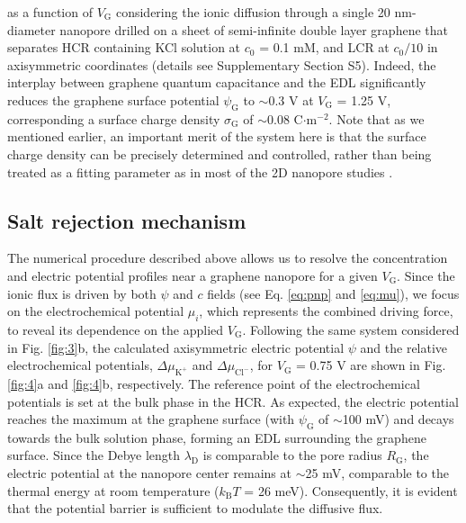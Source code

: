 \documentclass[journal=langd5,email=true, hyperref=true, keywords=false]{achemso}
\newcommand{\Fig}{Fig.}
\begin{document}
as a function of $V_{\mathrm{G}}$ considering the ionic diffusion
through a single 20 nm-diameter nanopore drilled on a sheet of
semi-infinite double layer graphene that separates HCR containing KCl
solution at $c_{0}$ = 0.1 mM, and LCR at $c_{0}/10$ in axisymmetric
coordinates (details see Supplementary Section S5). Indeed, the
interplay between graphene quantum capacitance and the EDL
significantly reduces the graphene surface potential
$\psi_{\mathrm{G}}$ to $\sim$0.3 V at $V_{\mathrm{G}}$ = 1.25 V,
corresponding a surface charge density $\sigma_{\mathrm{G}}$ of
$\sim$0.08 C$\cdot$m$^{-2}$. Note that as we mentioned earlier, an
important merit of the system here is that the surface charge density
can be precisely determined and controlled, rather than being treated
as a fitting parameter as in most of the 2D nanopore studies
\cite{Rollings_2016}.

\subsection{Salt rejection mechanism}
\label{sec:mechanism}
The numerical procedure described above allows us to resolve the
concentration and electric potential profiles near a graphene
nanopore for a given $V_{\mathrm{G}}$. Since the ionic flux is driven
by both $\psi$ and $c$ fields (see Eq. \eqref{eq:pnp} and \eqref{eq:mu}),
we focus on the electrochemical potential $\mu_{i}$, which represents
the combined driving force, to reveal its dependence on the applied
$V_{\mathrm{G}}$. Following the same system considered in \Fig{}
\ref{fig:3}b, the calculated axisymmetric electric potential $\psi$
and the relative electrochemical potentials,
$\Delta \mu_{\mathrm{K^{+}}}$ and $\Delta \mu_{\mathrm{Cl^{-}}}$, for
$V_{\mathrm{G}}$ = 0.75 V are shown in \Fig{} \ref{fig:4}a and
\ref{fig:4}b, respectively. The reference point of the electrochemical
potentials is set at the bulk phase in the HCR. As expected, the
electric potential reaches the maximum at the graphene surface (with
$\psi_{\mathrm{G}}$ of $\sim$100 mV) and decays towards the bulk
solution phase, forming an EDL surrounding the graphene surface. Since
the Debye length $\lambda_{\mathrm{D}}$ is comparable to the
pore radius $R_{\mathrm{G}}$, the electric potential at the nanopore
center remains at $\sim$25 mV, comparable to the thermal energy at
room temperature ($k_{\mathrm{B}}T$ = 26 meV). Consequently, it is
evident that the potential barrier is sufficient to modulate the
diffusive flux.
\end{document}
